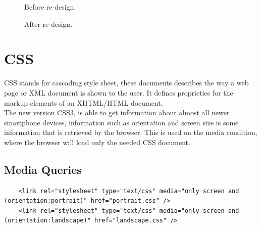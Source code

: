 \begin{figure}[h!]
	\center
		\setlength\fboxsep{0pt}
		\setlength\fboxrule{1pt}
   	\caption{Before re-design.}
\end{figure}


\begin{figure}[h!]
	\center
		\setlength\fboxsep{0pt}
		\setlength\fboxrule{1pt}
   	\caption{After re-design.}
\end{figure}

\newpage

\section{CSS}  %

CSS stands for cascading style sheet, these documents describes the way a web page or XML document is shown to the user. It defines proprieties for the markup elements of an XHTML/HTML document.
\\
The new version CSS3, is able to get information about almost all newer smartphone devices, information such as orientation and screen size is some information that is retrieved by the browser. This is used on the media condition, where the browser will load only the needed CSS document.
\subsection{Media Queries}

\begin{lstlisting}
	<link rel="stylesheet" type="text/css" media="only screen and (orientation:portrait)" href="portrait.css" />
	<link rel="stylesheet" type="text/css" media="only screen and (orientation:landscape)" href="landscape.css" />
\end{lstlisting}


